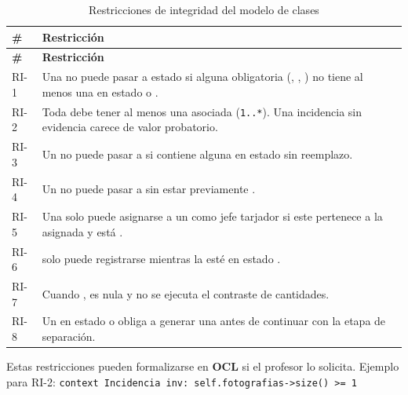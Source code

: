 {\estilotabla
\begin{longtable}{C{0.07\textwidth} L{0.87\textwidth}}

\caption{Restricciones de integridad del modelo de clases}
\label{tab:integridad}
\\

\toprule
\textbf{\#} & \textbf{Restricción} \\
\midrule
\endfirsthead

\toprule
\textbf{\#} & \textbf{Restricción} \\
\midrule
\endhead

RI-1 & Una  no puede pasar a estado  si alguna 
obligatoria (, , ) no tiene al menos una
 en estado  o . \\
\midrule

RI-2 & Toda  debe tener al menos una  asociada
(\texttt{1..*}). Una incidencia sin evidencia carece de valor probatorio. \\
\midrule

RI-3 & Un  no puede pasar a  si contiene alguna 
en estado  sin reemplazo. \\
\midrule

RI-4 & Un  no puede pasar a  sin estar previamente
. \\
\midrule

RI-5 & Una  solo puede asignarse a un  como jefe tarjador si este
pertenece a la  asignada y está . \\
\midrule

RI-6 &  solo puede registrarse mientras la  esté en
estado . \\
\midrule

RI-7 & Cuando , 
es nula y no se ejecuta el contraste de cantidades. \\
\midrule

RI-8 & Un  en estado  o  obliga a generar
una  antes de continuar con la etapa de separación. \\

\bottomrule

\end{longtable}
}

\begin{pendiente}
Estas restricciones pueden formalizarse en \textbf{OCL} si el profesor lo solicita. Ejemplo para
RI-2: \texttt{context Incidencia inv: self.fotografias->size() >= 1}
\end{pendiente}

